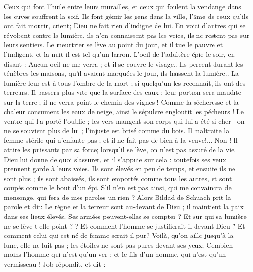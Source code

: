 \begin{multicols}{2}
{Ceux qui font l'huile entre leurs murailles, et ceux qui foulent la vendange dans les cuves souffrent la soif.
Ils font gémir les gens dans la ville, l'âme de ceux qu'ils ont fait mourir, crient; Dieu ne fait rien d'indigne de lui.
En voici d'autres qui se révoltent contre la lumière, ils n'en connaissent pas les voies, ils ne restent pas sur leurs sentiers.
Le meurtrier se lève au point du jour, et il tue le pauvre et l'indigent, et la nuit il est tel qu'un larron.
L'oeil de l'adultère épie le soir, en disant : Aucun oeil ne me verra ; et il se couvre le visage..
Ils percent durant les ténèbres les maisons, qu'il avaient marquées le jour, ils haïssent la lumière..
La lumière leur est à tous l'ombre de la mort ; si quelqu'un les reconnaît, ils ont des terreurs.
Il passera plus vite que la surface des eaux ; leur portion sera maudite sur la terre ; il ne verra point le chemin des vignes !
Comme la sécheresse et la chaleur consument les eaux de neige, ainsi le sépulcre engloutit les pécheurs !
Le ventre qui l'a porté l'oublie ; les vers mangent son corps qui lui a été si cher ; on ne se souvient plus de lui ; l'injuste est brisé comme du bois.
Il maltraite la femme stérile qui n'enfante pas ; et il ne fait pas de bien à la veuve!...
Non ! Il attire  les puissants par sa force; lorsqu'il se lève, on n'est pas assuré de la vie. 
Dieu lui donne de quoi s'assurer, et il s'appuie sur cela ; toutefois ses yeux prennent garde à leurs voies.
Ils sont élevés en peu de temps, et ensuite ils ne sont plus ; ils sont abaissés, ils sont emportés comme tous les autres, et sont coupés comme le bout d'un épi. 
S'il n'en est pas ainsi, qui me convaincra de mensonge, qui fera de mes paroles un rien ?
\VerseOne{}Alors Bildad de Schuach prit la parole et dit: 
Le règne et la terreur sont au-devant de Dieu ; il maintient la paix dans ses lieux élevés.
 Ses armées peuvent-elles se compter ? Et sur qui sa lumière ne se lève-t-elle point ? ?
Et comment l'homme se justifierait-il devant Dieu ? Et comment celui qui est né de femme serait-il pur?
Voilà, qu'on aille jusqu'à la lune, elle ne luit pas ; les étoiles ne sont pas pures devant ses yeux;
Combien moins l'homme qui n'est qu'un ver ; et le fils d'un homme, qui n'est qu'un vermisseau  !
\VerseOne{}Job répondit, et dit :
}
\end{multicols}
